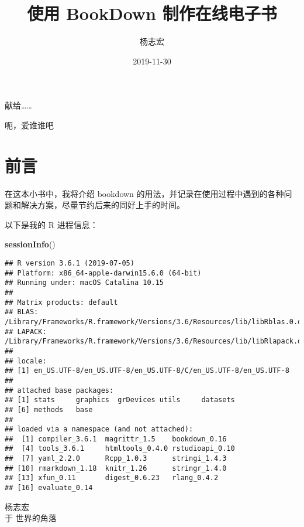 \documentclass[]{ctexbook}
\title{使用 BookDown 制作在线电子书}
\author{杨志宏}
\date{2019-11-30}
\newenvironment{Shaded}{\begin{snugshade}}{\end{snugshade}}
\newcommand{\KeywordTok}[1]{\textcolor[rgb]{0.13,0.29,0.53}{\textbf{#1}}}
\newcommand{\NormalTok}[1]{#1}
\let\BeginKnitrBlock\begin \let\EndKnitrBlock\end
\begin{document}
\maketitle


\thispagestyle{empty}

\begin{center}
献给……

呃，爱谁谁吧
\end{center}

\setlength{\abovedisplayskip}{-5pt}
\setlength{\abovedisplayshortskip}{-5pt}

{
\setcounter{tocdepth}{2}
\tableofcontents
}
\listoftables
\listoffigures
\hypertarget{ux524dux8a00}{%
\chapter*{前言}\label{ux524dux8a00}}


在这本小书中，我将介绍 bookdown 的用法，并记录在使用过程中遇到的各种问题和解决方案，尽量节约后来的同好上手的时间。

以下是我的 R 进程信息：

\begin{Shaded}
\begin{Highlighting}[]
\KeywordTok{sessionInfo}\NormalTok{()}
\end{Highlighting}
\end{Shaded}

\begin{verbatim}
## R version 3.6.1 (2019-07-05)
## Platform: x86_64-apple-darwin15.6.0 (64-bit)
## Running under: macOS Catalina 10.15
## 
## Matrix products: default
## BLAS:   /Library/Frameworks/R.framework/Versions/3.6/Resources/lib/libRblas.0.dylib
## LAPACK: /Library/Frameworks/R.framework/Versions/3.6/Resources/lib/libRlapack.dylib
## 
## locale:
## [1] en_US.UTF-8/en_US.UTF-8/en_US.UTF-8/C/en_US.UTF-8/en_US.UTF-8
## 
## attached base packages:
## [1] stats     graphics  grDevices utils     datasets 
## [6] methods   base     
## 
## loaded via a namespace (and not attached):
##  [1] compiler_3.6.1  magrittr_1.5    bookdown_0.16  
##  [4] tools_3.6.1     htmltools_0.4.0 rstudioapi_0.10
##  [7] yaml_2.2.0      Rcpp_1.0.3      stringi_1.4.3  
## [10] rmarkdown_1.18  knitr_1.26      stringr_1.4.0  
## [13] xfun_0.11       digest_0.6.23   rlang_0.4.2    
## [16] evaluate_0.14
\end{verbatim}

\BeginKnitrBlock{flushright}
杨志宏\\
于 世界的角落
\EndKnitrBlock{flushright}
\end{document}
